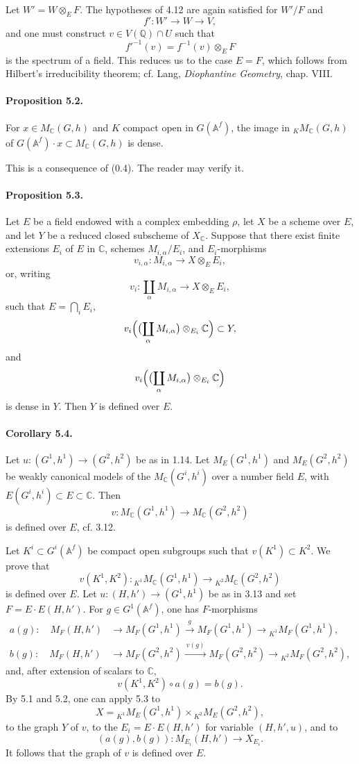 \documentclass[10pt]{article}
\newcommand{\Af}{\mathbb A^f}
\newcommand{\C}{\mathbb C}
\newcommand{\Q}{\mathbb Q}
\newcommand{\MC}{M_{\C}}
\begin{document}
Let $W'=W\otimes_EF$. The hypotheses of 4.12 are again satisfied for $W'/F$ and
\[
f':W'\longrightarrow W\longrightarrow V,
\]
and one must construct $v\in V(\Q)\cap U$ such that
\[
f'^{-1}(v)=f^{-1}(v)\otimes_EF
\]
is the spectrum of a field. This reduces us to the case $E=F$, which follows from Hilbert's irreducibility theorem; cf. Lang, \emph{Diophantine Geometry}, chap. VIII.

\paragraph{Proposition 5.2.} For $x\in\MC(G,h)$ and $K$ compact open in $G(\Af)$, the image in ${}_K\MC(G,h)$ of $G(\Af)\cdot x\subset\MC(G,h)$ is dense.

This is a consequence of (0.4). The reader may verify it.

\paragraph{Proposition 5.3.} Let $E$ be a field endowed with a complex embedding $\rho$, let $X$ be a scheme over $E$, and let $Y$ be a reduced closed subscheme of $X_{\C}$. Suppose that there exist finite extensions $E_i$ of $E$ in $\C$, schemes $M_{i,\alpha}/E_i$, and $E_i$-morphisms
\[
v_{i,\alpha}:M_{i,\alpha}\longrightarrow X\otimes_EE_i,
\]
or, writing
\[
v_i:\coprod_\alpha M_{i,\alpha}\longrightarrow X\otimes_EE_i,
\]
such that $E=\bigcap_i E_i$,
\[
v_i\Bigl(\bigl(\coprod_\alpha M_{i,\alpha}\bigr)\otimes_{E_i}\C\Bigr)\subset Y,
\]
and
\[
v_i\Bigl(\bigl(\coprod_\alpha M_{i,\alpha}\bigr)\otimes_{E_i}\C\Bigr)
\]
is dense in $Y$. Then $Y$ is defined over $E$.

\paragraph{Corollary 5.4.} Let $u:(G^1,h^1)\to(G^2,h^2)$ be as in 1.14. Let $M_E(G^1,h^1)$ and $M_E(G^2,h^2)$ be weakly canonical models of the $\MC(G^i,h^i)$ over a number field $E$, with $E(G^i,h^i)\subset E\subset\C$. Then
\[
v:\MC(G^1,h^1)\longrightarrow\MC(G^2,h^2)
\]
is defined over $E$, cf. 3.12.

Let $K^i\subset G^i(\Af)$ be compact open subgroups such that $v(K^1)\subset K^2$. We prove that
\[
v(K^1,K^2):{}_{K^1}\MC(G^1,h^1)\longrightarrow{}_{K^2}\MC(G^2,h^2)
\]
is defined over $E$. Let $u:(H,h')\to(G^1,h^1)$ be as in 3.13 and set $F=E\cdot E(H,h')$. For $g\in G^1(\Af)$, one has $F$-morphisms
\[
\begin{aligned}
a(g):\quad M_F(H,h')&\longrightarrow M_F(G^1,h^1)
 \xrightarrow{\ g\ } M_F(G^1,h^1)
 \longrightarrow {}_{K^1}M_F(G^1,h^1),\\
b(g):\quad M_F(H,h')&\longrightarrow M_F(G^2,h^2)
 \xrightarrow{\ v(g)\ } M_F(G^2,h^2)
 \longrightarrow {}_{K^2}M_F(G^2,h^2),
\end{aligned}
\]
and, after extension of scalars to $\C$,
\[
v(K^1,K^2)\circ a(g)=b(g).
\]
By 5.1 and 5.2, one can apply 5.3 to
\[
X={}_{K^1}M_E(G^1,h^1)\times{}_{K^2}M_E(G^2,h^2),
\]
to the graph $Y$ of $v$, to the $E_i=E\cdot E(H,h')$ for variable $(H,h',u)$, and to
\[
(a(g),b(g)):M_{E_i}(H,h')\longrightarrow X_{E_i}.
\]
It follows that the graph of $v$ is defined over $E$.
\end{document}
